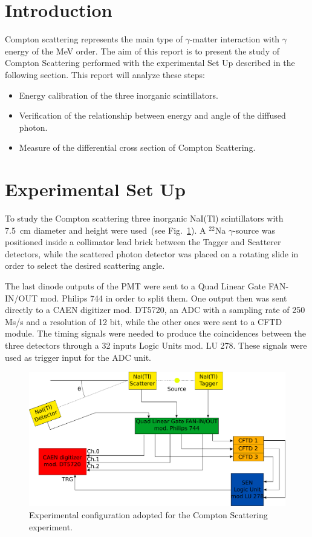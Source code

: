 \section*{Introduction}

Compton scattering represents the main  type of $\gamma$-matter interaction with $\gamma$ energy of the MeV order.   
The aim of this report is to present the study of Compton Scattering performed with the experimental Set Up described in the following section.
This report will analyze these steps:
\begin{itemize}
	\item Energy calibration of the three inorganic scintillators.
	\item Verification of the relationship between energy and angle of the diffused photon.
	\item Measure of the differential cross section of Compton Scattering.
\end{itemize}

\section*{Experimental Set Up}

To study the Compton scattering three inorganic NaI(Tl) scintillators with 7.5~cm diameter and height were used~(see Fig.~\ref{fig:Set_up}). A $^{22}$Na $\gamma$-source was positioned inside a collimator lead brick between the Tagger and Scatterer detectors, while the scattered photon detector was placed on a rotating slide in order to select the desired scattering angle.

The last dinode outputs of the PMT were sent to a Quad Linear Gate FAN-IN/OUT mod. Philips 744 in order to split them. One output then was sent directly to a CAEN digitizer mod. DT5720, an ADC with a sampling rate of 250 Ms/s and a resolution of 12 bit, while the other ones were sent to a  CFTD module. The timing signals were needed to produce the coincidences between the three detectors through a 32 inputs Logic Units mod. LU 278. These signals were used as trigger input for the ADC unit.

\begin{figure}[h!]
	\centering
	\includegraphics[width=\textwidth]{immagini/SetUp.pdf}
	\caption{Experimental configuration adopted for the Compton Scattering experiment.}
	\label{fig:Set_up}
\end{figure}